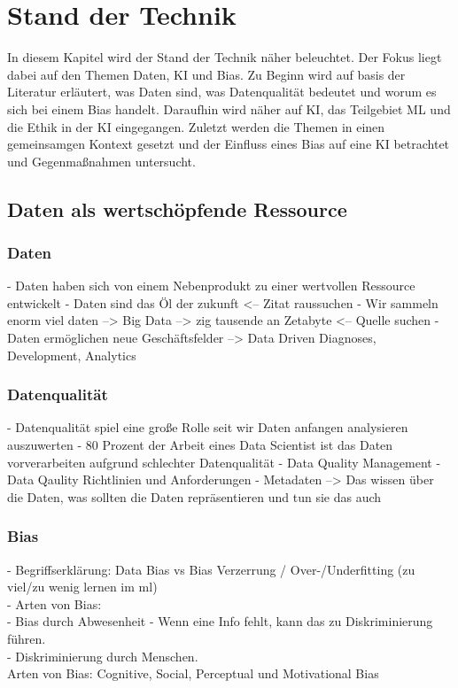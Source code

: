 \chapter{Stand der Technik}
    \begin{onehalfspace}  
        \label{sec:theorie/standdertechnik}
            In diesem Kapitel wird der Stand der Technik näher beleuchtet. Der Fokus liegt dabei auf den Themen Daten, \ac{KI} und Bias. Zu Beginn wird auf basis der Literatur erläutert, was Daten sind, was Datenqualität bedeutet und worum es sich bei einem Bias handelt. Daraufhin wird näher auf \ac{KI}, das Teilgebiet \ac{ML} und die Ethik in der \ac{KI} eingegangen. Zuletzt werden die Themen in einen gemeinsamgen Kontext gesetzt und der Einfluss eines Bias auf eine \ac{KI} betrachtet und Gegenmaßnahmen untersucht. 
        
        \section{Daten als wertschöpfende Ressource}
        \label{subsec:datenchapter}
        \subsection{Daten}
        \label{subsubsec:daten}
            - Daten haben sich von einem Nebenprodukt zu einer wertvollen Ressource entwickelt
            - Daten sind das Öl der zukunft <-- Zitat raussuchen
            - Wir sammeln enorm viel daten --> Big Data --> zig tausende an Zetabyte <-- Quelle suchen
            - Daten ermöglichen neue Geschäftsfelder --> Data Driven Diagnoses, Development, Analytics
            \cite{Otto2019}

        \subsection{Datenqualität}
        \label{subsubsec:datenqualität}
            - Datenqualität spiel eine große Rolle seit wir Daten anfangen analysieren auszuwerten
            - 80 Prozent der Arbeit eines Data Scientist ist das Daten vorverarbeiten aufgrund schlechter Datenqualität
            - Data Quality Management
            - Data Qaulity Richtlinien und Anforderungen
            - Metadaten --> Das wissen über die Daten, was sollten die Daten repräsentieren und tun sie das auch

        \subsection{Bias}
        \label{subsubsec:Bias}
            -   Begriffserklärung: Data Bias vs Bias Verzerrung / Over-/Underfitting (zu viel/zu wenig lernen im ml)\\
            -   Arten von Bias: \\
                -   Bias durch Abwesenheit - Wenn eine Info fehlt, kann das zu Diskriminierung führen. \\
                -   Diskriminierung durch Menschen. \\
            Arten von Bias: Cognitive, Social, Perceptual und Motivational Bias \cite{Parkavi2018}
 


\end{onehalfspace}
